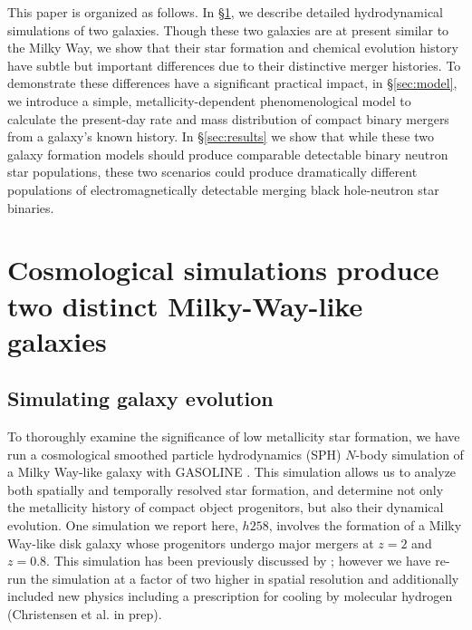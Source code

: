 \documentclass[nofootinbib,twocolumn,prd]{emulateapj}
\newcommand\editremark[1]{{\color{red}#1}}
\begin{document}
This paper is organized as follows. 
In \S \ref{sec:sims}, we describe detailed hydrodynamical simulations of  two galaxies.  Though these two
galaxies are at  present similar to the Milky Way, we
show that their star formation and chemical evolution history have subtle but important differences due to their
distinctive merger histories.   To demonstrate
these differences have a significant practical impact,  in \S \ref{sec:model}, we introduce a simple,
metallicity-dependent  phenomenological model to calculate the present-day rate and mass distribution of compact binary
mergers from  a galaxy's known history.  
In \S \ref{sec:results} we show that while these two galaxy formation models should produce comparable detectable binary neutron star
populations, these two scenarios could produce dramatically different populations of electromagnetically detectable
merging black hole-neutron star binaries. 
%






\section{Cosmological simulations produce two distinct Milky-Way-like galaxies}
\label{sec:sims}

\subsection{Simulating galaxy evolution}
To thoroughly examine the significance of low metallicity star
formation, we have run a cosmological smoothed particle hydrodynamics
(SPH) $N$-body simulation of a Milky Way-like galaxy with GASOLINE
\citep{Stadel01,Wadsley04}.  This simulation allows us to analyze both
spatially and temporally resolved star formation, and determine not
only the metallicity history of compact object progenitors, but also
their dynamical evolution.  One simulation we report here, $h258$,
involves the formation of a Milky Way-like disk galaxy whose
progenitors undergo major mergers at $z = 2$ and $z = 0.8$.  This
simulation has been previously discussed by
\citet{Governato09,Bellovary10,Bellovary11,Brooks11}; however we have
re-run the simulation at a factor of two higher in spatial resolution
and additionally included new physics including a prescription for
cooling by molecular hydrogen (Christensen et al. in prep).
\end{document}
